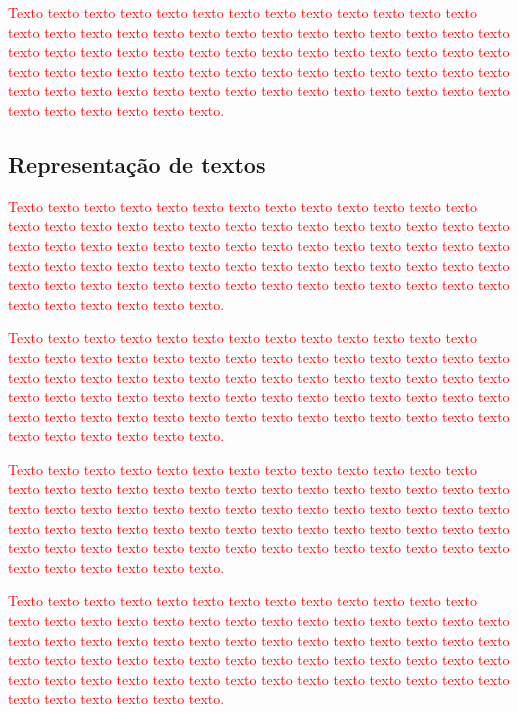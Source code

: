 \documentclass[normaltoc, espacoumemeio, pnumromarab,ruledheader]{abnt}
\begin{document}
	\textcolor{red}{Texto texto texto texto texto texto texto texto texto texto texto texto texto texto texto texto texto texto texto texto texto texto texto texto texto texto texto texto texto texto texto texto texto texto texto texto texto texto texto texto texto texto texto texto texto texto texto texto texto texto texto texto texto texto texto texto texto texto texto texto texto texto texto texto texto texto texto texto texto texto texto texto texto texto texto.}
	
	 \subsection{Representação de textos}
	
	\textcolor{red}{Texto texto texto texto texto texto texto texto texto texto texto texto texto texto texto texto texto texto texto texto texto texto texto texto texto texto texto texto texto texto texto texto texto texto texto texto texto texto texto texto texto texto texto texto texto texto texto texto texto texto texto texto texto texto texto texto texto texto texto texto texto texto texto texto texto texto texto texto texto texto texto texto texto texto texto.}
	
	\textcolor{red}{Texto texto texto texto texto texto texto texto texto texto texto texto texto texto texto texto texto texto texto texto texto texto texto texto texto texto texto texto texto texto texto texto texto texto texto texto texto texto texto texto texto texto texto texto texto texto texto texto texto texto texto texto texto texto texto texto texto texto texto texto texto texto texto texto texto texto texto texto texto texto texto texto texto texto texto.}
	
	\textcolor{red}{Texto texto texto texto texto texto texto texto texto texto texto texto texto texto texto texto texto texto texto texto texto texto texto texto texto texto texto texto texto texto texto texto texto texto texto texto texto texto texto texto texto texto texto texto texto texto texto texto texto texto texto texto texto texto texto texto texto texto texto texto texto texto texto texto texto texto texto texto texto texto texto texto texto texto texto.}
	
	\textcolor{red}{Texto texto texto texto texto texto texto texto texto texto texto texto texto texto texto texto texto texto texto texto texto texto texto texto texto texto texto texto texto texto texto texto texto texto texto texto texto texto texto texto texto texto texto texto texto texto texto texto texto texto texto texto texto texto texto texto texto texto texto texto texto texto texto texto texto texto texto texto texto texto texto texto texto texto texto.}
\end{document}
